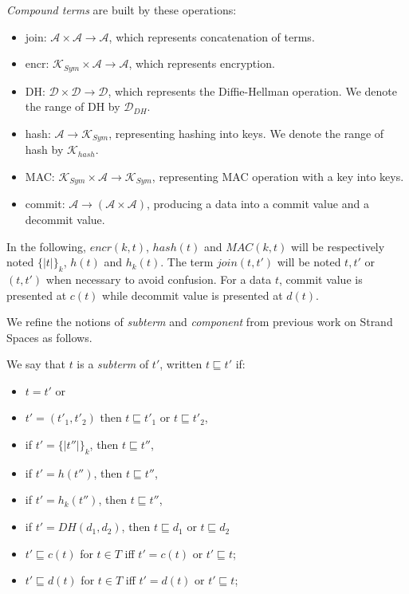 \begin{Definition}
\emph{Compound terms} are built by these operations:
\begin{itemize} 
\item join: $\mathcal{A} \times \mathcal{A} \rightarrow \mathcal{A}$, which represents concatenation of terms. 
\item encr: $\mathcal{K}_{Sym} \times \mathcal{A} \rightarrow \mathcal{A}$, which represents encryption. 
\item DH: $\mathcal{D} \times \mathcal{D} \rightarrow \mathcal{D}$, which represents the Diffie-Hellman operation. We denote the range of DH by $\mathcal{D}_{DH}$.
\item hash: $\mathcal{A} \rightarrow \mathcal{K}_{Sym}$, representing hashing into keys. We denote the range of hash by $\mathcal{K}_{hash}$. 
\item MAC: $\mathcal{K}_{Sym} \times \mathcal{A} \rightarrow \mathcal{K}_{Sym}$, representing MAC operation with a key into keys.
\item commit: $\mathcal{A} \rightarrow (\mathcal{A} \times \mathcal{A})$, producing a data into a commit value and a decommit value.
\end{itemize}
\end{Definition} 

In the following, $encr(k,t)$, $hash(t)$ and $MAC(k,t)$ will be respectively noted ${\{|t|\}}_k$, $h(t)$ and $h_k(t)$. The term $join(t,t')$ will be noted $t,t'$ or $(t,t')$ when necessary to avoid confusion. For a data $t$, commit value is presented at $c(t)$ while decommit value is presented at $d(t)$.

We refine the notions of \textit{subterm} and \textit{component} from previous work on Strand Spaces as follows.

\begin{Definition}[Subterm]
We say that $t$ is a \emph{subterm} of $t'$, written $t \sqsubseteq t'$ if:
\begin{itemize}
\item $t=t'$ or
\item $t'= (t'_1,t'_2)$ then $t \sqsubseteq t'_1$ or $t \sqsubseteq t'_2$,
\item if $t'={\{|t''|\}}_k$, then $t \sqsubseteq t''$,
\item if $t'=h(t'')$, then $t \sqsubseteq t''$,
\item if $t'=h_k(t'')$, then $t \sqsubseteq t''$,
\item if $t'=DH(d_1,d_2)$, then $t \sqsubseteq d_1$ or $t \sqsubseteq d_2$
\item $t' \sqsubseteq c(t)$ for $t \in T$ iff $t' = c(t) $ or $t' \sqsubseteq t$;
\item $t' \sqsubseteq d(t)$ for $t \in T$ iff $t' = d(t)$ or $t' \sqsubseteq t$;
\end{itemize}
\end{Definition}

